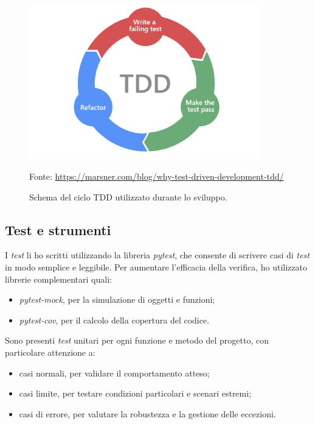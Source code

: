 \begin{figure}[H]
    \begin{center}
    \includegraphics[width=0.9\textwidth]{img/TDD.png}
    \caption{Schema del ciclo TDD utilizzato durante lo sviluppo.}
    Fonte: \url{https://marsner.com/blog/why-test-driven-development-tdd/}
    \label{fig:tdd}
    \end{center}
\end{figure}

\subsection{Test e strumenti}
I \textit{test} li ho scritti utilizzando la libreria \textit{pytest}, che consente di scrivere casi di \textit{test} in modo semplice e leggibile. Per aumentare l'efficacia della verifica, ho utilizzato librerie complementari quali:
\begin{itemize}
    \item \textit{pytest-mock}, per la simulazione di oggetti e funzioni;
    \item \textit{pytest-cov}, per il calcolo della copertura del codice.
\end{itemize}

Sono presenti \textit{test} unitari per ogni funzione e metodo del progetto, con particolare attenzione a:
\begin{itemize}
    \item casi normali, per validare il comportamento atteso;
    \item casi limite, per testare condizioni particolari e scenari estremi;
    \item casi di errore, per valutare la robustezza e la gestione delle eccezioni.
\end{itemize}

